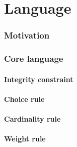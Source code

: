 \part{Language}
\section{Motivation}

\section{Core language}
\subsection{Integrity constraint}

\subsection{Choice rule}

\subsection{Cardinality rule}

\subsection{Weight rule}

% 
% 
% 
%
